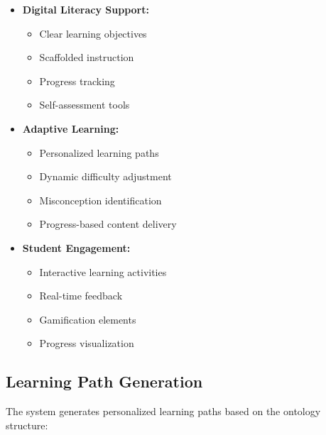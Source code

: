 \begin{itemize}
  \item \textbf{Digital Literacy Support:}
    \begin{itemize}
      \item Clear learning objectives
      \item Scaffolded instruction
      \item Progress tracking
      \item Self-assessment tools
    \end{itemize}
  
  \item \textbf{Adaptive Learning:}
    \begin{itemize}
      \item Personalized learning paths
      \item Dynamic difficulty adjustment
      \item Misconception identification
      \item Progress-based content delivery
    \end{itemize}
  
  \item \textbf{Student Engagement:}
    \begin{itemize}
      \item Interactive learning activities
      \item Real-time feedback
      \item Gamification elements
      \item Progress visualization
    \end{itemize}
\end{itemize}

\subsection{Learning Path Generation}
\label{subsec:learning-path}

The system generates personalized learning paths based on the ontology structure:

